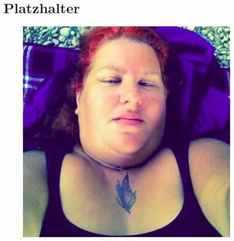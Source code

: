 \chapter{Platzhalter}

\begin{figure}[h!]
\centering
\includegraphics[width=0.7\linewidth]{fig/empty}
\caption{}
\label{fig:empty}
\end{figure}
